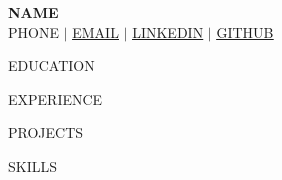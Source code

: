\documentclass[letterpaper,11pt]{article}
\begin{document}

\begin{center}
    \textbf{\Huge \scshape {{NAME}}} \\ \vspace{1pt}
    \small {{PHONE}} $|$ \href{mailto:{{EMAIL}}}{\underline{{{EMAIL}}}} $|$
    \href{https://{{LINKEDIN}}}{\underline{{{LINKEDIN}}}} $|$
    \href{https://{{GITHUB}}}{\underline{{{GITHUB}}}}
\end{center}


{{EDUCATION}}


{{EXPERIENCE}}


{{PROJECTS}}


{{SKILLS}}


\end{document}
